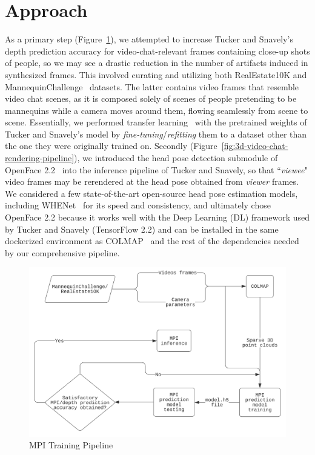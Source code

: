 \section{Approach}\label{sec:approach} 

As a primary step (Figure~\ref{fig:mpi-training-pipeline}), we attempted to increase Tucker and Snavely's depth prediction accuracy for video-chat-relevant frames containing close-up shots of people, so we may see a drastic reduction in the number of artifacts induced in synthesized frames. This involved curating and utilizing both RealEstate10K and MannequinChallenge~\cite{li2019learning} datasets. The latter contains video frames that resemble video chat scenes, as it is composed solely of scenes of people pretending to be mannequins while a camera moves around them, flowing seamlessly from scene to scene. Essentially, we performed transfer learning~\cite{radhakrishnan_what_2019} with the pretrained weights of Tucker and Snavely's model by \textit{fine-tuning}/\textit{refitting} them to a dataset other than the one they were originally trained on. Secondly (Figure~\ref{fig:3d-video-chat-rendering-pipeline}), we introduced the head pose detection submodule of OpenFace 2.2~\cite{baltrusaitis_openface_2018} into the inference pipeline of Tucker and Snavely, so that ``\textit{viewee}" video frames may be rerendered at the head pose obtained from \textit{viewer} frames. We considered a few state-of-the-art open-source head pose estimation models, including WHENet~\cite{zhou_whenet_2020} for its speed and consistency, and ultimately chose OpenFace 2.2 because it works well with the Deep Learning (DL) framework used by Tucker and Snavely (TensorFlow 2.2) and can be installed in the same dockerized environment as COLMAP~\cite{schoenberger2016sfm,schoenberger2016mvs} and the rest of the dependencies needed by our comprehensive pipeline. 

\begin{figure}[!h]
    \includegraphics[width=1\columnwidth]{figures/mpi-training-pipieline.png}
    \caption{MPI Training Pipeline}
    \label{fig:mpi-training-pipeline}
\end{figure}

